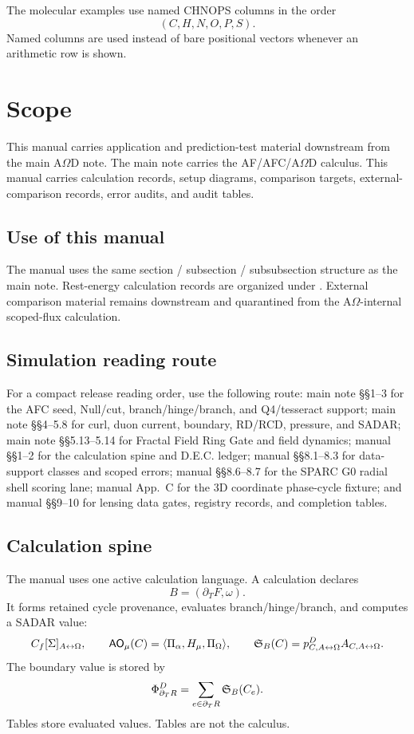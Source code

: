 The molecular examples use named CHNOPS columns in the order
\[
(C,H,N,O,P,S).
\]
Named columns are used instead of bare positional vectors whenever an arithmetic row is shown.

\else

\section{Scope}\label{manual:scope}
This manual carries application and prediction-test material downstream from the main A\(\Omega\)D note. The main note carries the AF/AFC/A\(\Omega\)D calculus. This manual carries calculation records, setup diagrams, comparison targets, external-comparison records, error audits, and audit tables.

\subsection{Use of this manual}\label{manual:scope:use}
The manual uses the same section / subsection / subsubsection structure as the main note. Rest-energy calculation records are organized under . External comparison material remains downstream and quarantined from the A\(\Omega\)-internal scoped-flux calculation.


\subsection{Simulation reading route}\label{manual:simulation-reading-route}
For a compact release reading order, use the following route: main note \S\S1--3 for the AFC seed, Null/cut, branch/hinge/branch, and Q4/tesseract support; main note \S\S4--5.8 for curl, duon current, boundary, RD/RCD, pressure, and SADAR; main note \S\S5.13--5.14 for Fractal Field Ring Gate and field dynamics; manual \S\S1--2 for the calculation spine and D.E.C. ledger; manual \S\S8.1--8.3 for data-support classes and scoped errors; manual \S\S8.6--8.7 for the SPARC G0 radial shell scoring lane; manual App.~C for the 3D coordinate phase-cycle fixture; and manual \S\S9--10 for lensing data gates, registry records, and completion tables.





\subsection{Calculation spine}\label{manual:calculation-spine}
The manual uses one active calculation language. A calculation declares
\[
B=(\partial_TF,\omega).
\]
It forms retained cycle provenance, evaluates branch/hinge/branch, and computes a SADAR value:
\[
C_f[\Sigma]_{A{\leftrightarrow}\Omega},
\qquad
\mathsf{AO}_{\mu}(C)=\langle\Pi_\alpha,H_\mu,\Pi_\Omega\rangle,
\qquad
\mathfrak S_B(C)=p^D_{C,A{\leftrightarrow}\Omega}A_{C,A{\leftrightarrow}\Omega}.
\]
The boundary value is stored by
\[
\Phi^D_{\partial_T R}=\sum_{e\in\partial_T R}\mathfrak S_B(C_e).
\]
Tables store evaluated values. Tables are not the calculus.

